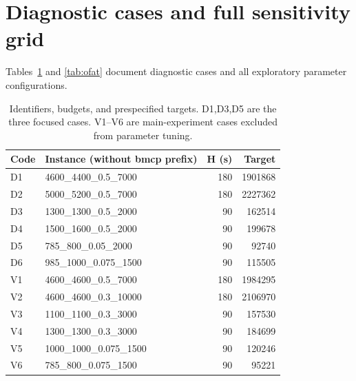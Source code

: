 \section{Diagnostic cases and full sensitivity grid}
\label{app:diagnostics}
Tables~\ref{tab:diagnostic-cases} and \ref{tab:ofat} document diagnostic cases and all exploratory parameter configurations.
\begin{table}[H]
\centering\small
\caption{Identifiers, budgets, and prespecified targets. D1,D3,D5 are the three focused cases. V1--V6 are main-experiment cases excluded from parameter tuning.}
\label{tab:diagnostic-cases}
\begin{tabular}{llrr}
\toprule
Code & Instance (without bmcp prefix) & H (s) & Target\\
\midrule
D1 & 4600\_4400\_0.5\_7000 & 180 & 1901868\\
D2 & 5000\_5200\_0.5\_7000 & 180 & 2227362\\
D3 & 1300\_1300\_0.5\_2000 & 90 & 162514\\
D4 & 1500\_1600\_0.5\_2000 & 90 & 199678\\
D5 & 785\_800\_0.05\_2000 & 90 & 92740\\
D6 & 985\_1000\_0.075\_1500 & 90 & 115505\\
V1 & 4600\_4600\_0.5\_7000 & 180 & 1984295\\
V2 & 4600\_4600\_0.3\_10000 & 180 & 2106970\\
V3 & 1100\_1100\_0.3\_3000 & 90 & 157530\\
V4 & 1300\_1300\_0.3\_3000 & 90 & 184699\\
V5 & 1000\_1000\_0.075\_1500 & 90 & 120246\\
V6 & 785\_800\_0.075\_1500 & 90 & 95221\\
\bottomrule
\end{tabular}
\end{table}

